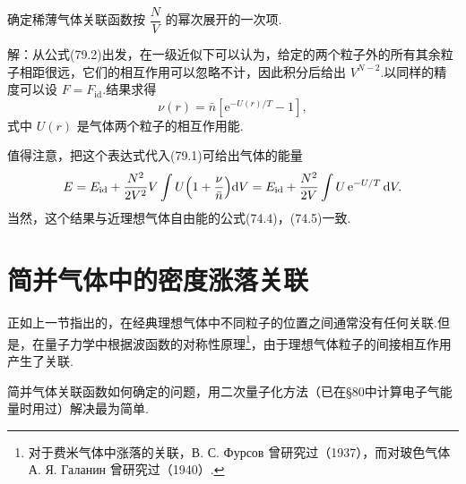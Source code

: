 \begin{xiti}

确定稀薄气体关联函数按 $\dfrac{N}{V}$ 的幂次展开的一次项.

解：从公式(79.2)出发，在一级近似下可以认为，给定的两个粒子外的所有其余粒子相距很远，它们的相互作用可以忽略不计，因此积分后给出 $V^{N-2}$.以同样的精度可以设
$F=F_{\mathrm{id}}$.结果求得
\begin{equation*}
  \nu(r)=\bar{n}\left[\mathrm{e}^{-U(r)/T}-1\right],
\end{equation*}
式中 $U(r)$ 是气体两个粒子的相互作用能.

值得注意，把这个表达式代入(79.1)可给出气体的能量
\begin{equation*}
  E=E_{\mathrm{id}}+\frac{N^{2}}{2V^{2}}V\int U\Bigl(1+\frac{\nu}{\bar{n}}\Bigr)
  \mathrm{d}V=E_{\mathrm{id}}+\frac{N^{2}}{2V}\int U\,\mathrm{e}^{-U/T}\,\mathrm{d}V.
\end{equation*}
当然，这个结果与近理想气体自由能的公式(74.4)，(74.5)一致.

\end{xiti}

\section{简并气体中的密度涨落关联}

正如上一节指出的，在经典理想气体中不同粒子的位置之间通常没有任何关联.但是，在量子力学中根据波函数的对称性原理\footnote{对于费米气体中涨落的关联，В. С. Фурсов 曾研究过（1937），而对玻色气体 А. Я. Галанин 曾研究过（1940）.}，由于理想气体粒子的间接相互作用产生了关联.

简并气体关联函数如何确定的问题，用二次量子化方法（已在§80中计算电子气能量时用过）解决最为简单.

